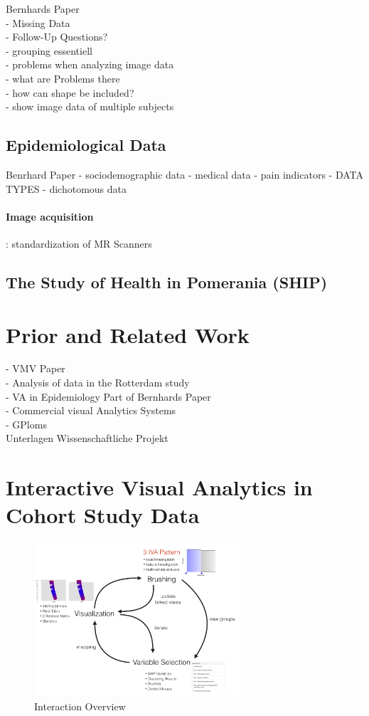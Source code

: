 \documentclass[journal]{style/vgtc}           %
\begin{document}
Bernhards Paper\\
- Missing Data\\
- Follow-Up Questions?\\
- grouping essentiell\\
- problems when analyzing image data\\
	- what are Problems there\\
	- how can shape be included?\\
	- show image data of multiple subjects
	
\subsection{Epidemiological Data}
Benrhard Paper
- sociodemographic data
- medical data
- pain indicators
- DATA TYPES
	- dichotomous data

	
\paragraph{Image acquisition}: standardization of MR Scanners

\subsection{The Study of Health in Pomerania (SHIP)}


\section{Prior and Related Work}
- VMV Paper\\
- Analysis of data in the Rotterdam study\\
- VA in Epidemiology Part of Bernhards Paper\\
	- Commercial visual Analytics Systems\\
- GPloms\\
Unterlagen Wissenschaftliche Projekt

\section{Interactive Visual Analytics in Cohort Study Data}
\begin{figure}[htb]
 \centering
 \includegraphics[width=3.0in]{figures/InteractionLoop}
 \caption{Interaction Overview}
\end{figure}
\end{document}
